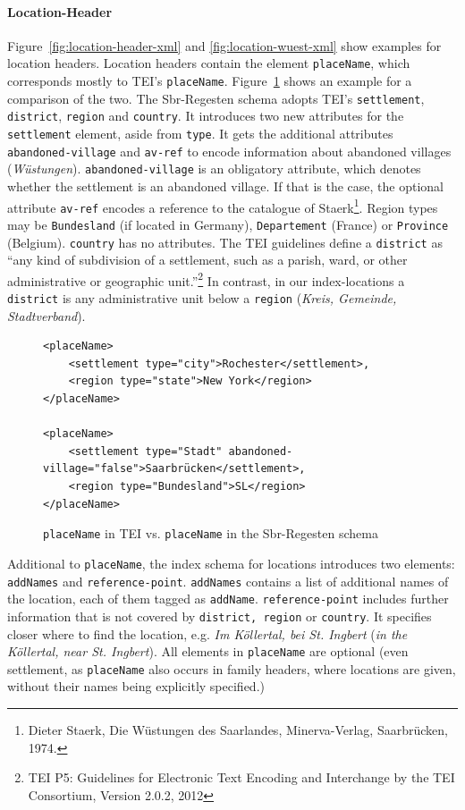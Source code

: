 \paragraph{Location-Header}
\label{sec:location-header}
Figure~\ref{fig:location-header-xml} and \ref{fig:location-wuest-xml}
show examples for location headers. Location headers contain the
element \texttt{placeName}, which corresponds mostly to TEI's
\texttt{placeName}. Figure~\ref{fig:placeName} shows an example for a
comparison of the two. The Sbr-Regesten schema adopts TEI's
\texttt{settlement}, \texttt{district}, \texttt{region} and
\texttt{country}. It introduces two new attributes for the
\texttt{settlement} element, aside from \texttt{type}. It gets the
additional attributes \texttt{abandoned-village} and \texttt{av-ref}
to encode information about abandoned villages (\textit{Wüstungen}).
\texttt{abandoned-village} is an obligatory attribute, which denotes
whether the settlement is an abandoned village. If that is the case,
the optional attribute \texttt{av-ref} encodes a reference to the
catalogue of Staerk\footnote{Dieter Staerk, Die Wüstungen des
  Saarlandes, Minerva-Verlag, Saarbrücken, 1974.}. Region types may be
\texttt{Bundesland} (if located in Germany), \texttt{Departement}
(France) or \texttt{Province} (Belgium). \texttt{country} has no
attributes. The TEI guidelines define a \texttt{district} as “any kind
of subdivision of a settlement, such as a parish, ward, or other
administrative or geographic unit.”\footnote{TEI P5: Guidelines for
  Electronic Text Encoding and Interchange by the TEI Consortium,
  Version 2.0.2, 2012} In contrast, in our index-locations a
\texttt{district} is any administrative unit below a \texttt{region}
(\textit{Kreis, Gemeinde, Stadtverband}).

\begin{figure}[H]
\centering
\begin{verbatim}
<placeName>
    <settlement type="city">Rochester</settlement>,
    <region type="state">New York</region>
</placeName>

<placeName>
    <settlement type="Stadt" abandoned-village="false">Saarbrücken</settlement>,
    <region type="Bundesland">SL</region>
</placeName>
\end{verbatim}
\caption{\texttt{placeName} in TEI vs. \texttt{placeName} in the
  Sbr-Regesten schema}
\label{fig:placeName}
\end{figure}

Additional to \texttt{placeName}, the index schema for locations
introduces two elements: \texttt{addNames} and
\texttt{reference-point}. \texttt{addNames} contains a list of
additional names of the location, each of them tagged as
\texttt{addName}. \texttt{reference-point} includes further
information that is not covered by \texttt{district, region} or
\texttt{country}. It specifies closer where to find the location, e.g.
\textit{Im Köllertal, bei St. Ingbert} (\textit{in the Köllertal, near
  St. Ingbert}). All elements in \texttt{placeName} are optional (even
settlement, as \texttt{placeName} also occurs in family headers, where
locations are given, without their names being explicitly specified.)

